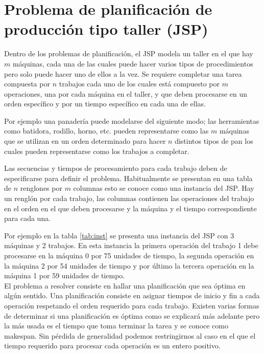 \section{Problema de planificación de producción tipo taller (JSP)}

Dentro de los problemas de planificación, el JSP modela un taller en el que hay $m$ máquinas, cada una de las cuales puede hacer varios tipos de procedimientos pero solo puede hacer uno de ellos a la vez. Se requiere completar una tarea compuesta por $n$ trabajos cada uno de los cuales está compuesto por $m$ operaciones, una por cada máquina en el taller, y que deben procesarse en un orden específico y por un tiempo específico en cada una de ellas. 

Por ejemplo una panadería puede modelarse del siguiente modo; las herramientas como batidora, rodillo, horno, etc. pueden representarse como las $m$ máquinas que se utilizan en un orden determinado para hacer $n$ distintos tipos de pan los cuales pueden representarse como los trabajos a completar.

Las secuencias y tiempos de procesamiento para cada trabajo deben de especificarse para definir el problema. Habitualmente se presentan en una tabla de $n$ renglones por $m$ columnas esto se conoce como una instancia del JSP. Hay un renglón por cada trabajo, las columnas contienen las operaciones del trabajo en el orden en el que deben procesarse y la máquina y el tiempo correspondiente para cada una.

Por ejemplo en la tabla \ref{tab:inst} se presenta una instancia del JSP con 3 máquinas y 2 trabajos. En esta instancia la primera operación del trabajo 1 debe procesarse en la máquina 0 por 75 unidades de tiempo, la segunda operación en la máquina 2 por 54 unidades de tiempo y por último la tercera operación en la máquina 1 por 59 unidades de tiempo.\\

El problema a resolver consiste en hallar una planificación que sea óptima en algún sentido. Una planificación consiste en asignar tiempos de inicio y fin a cada operación respetando el orden requerido para cada trabajo. Existen varias formas de determinar si una planificación es óptima como se explicará más adelante pero la más usada es el tiempo que toma terminar la tarea y se conoce como makespan. Sin pérdida de generalidad podemos restringirnos al caso en el que el tiempo requerido para procesar cada operación es un entero positivo.\\

